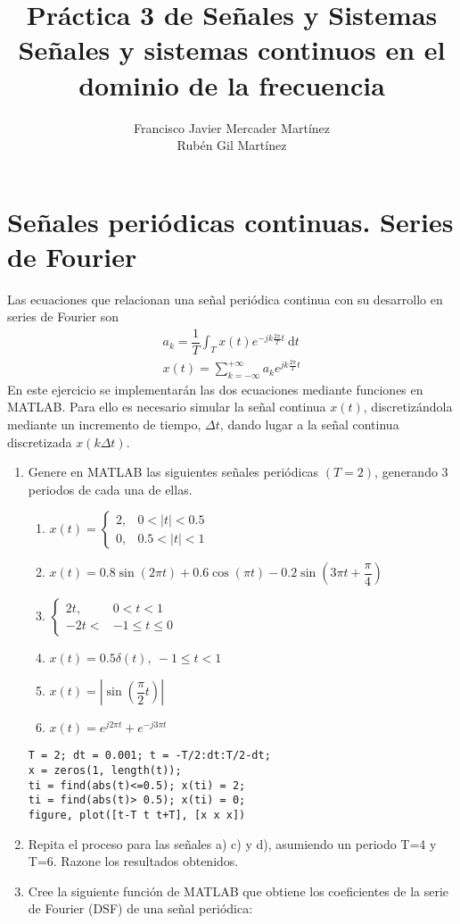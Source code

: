 \documentclass{article}
\title{\textbf{\huge Práctica 3 de Señales y Sistemas}\\ Señales y sistemas continuos en el dominio de la frecuencia}
\author{Francisco Javier Mercader Martínez\\ Rubén Gil Martínez}
\date{}
\newcommand{\dt}{\:\mathrm{d}t}
\begin{document}
\section{Señales periódicas continuas. Series de Fourier}
Las ecuaciones que relacionan una señal periódica continua con su desarrollo en series de Fourier son \[ \begin{array}{l}
	a_k=\dfrac{1}{T}\int_Tx(t)e^{-jk\frac{2\pi}{T}t}\dt\\
	x(t)=\sum_{k=-\infty}^{+\infty}a_ke^{jk\frac{2\pi}{T}t}
\end{array} \]
En este ejercicio se implementarán las dos ecuaciones mediante funciones en MATLAB. Para ello es necesario simular la señal continua $x(t)$, discretizándola mediante un incremento de tiempo, $\Delta t$, dando lugar a la señal continua discretizada $x(k\Delta t)$.
\begin{enumerate}[leftmargin=*]
	\item Genere en MATLAB las siguientes señales periódicas $(T=2)$, generando 3 periodos de cada una de ellas.
	\begin{enumerate}[label=\alph*)]
		\item $x(t)=\begin{cases}
			2, & 0<|t|<0.5\\
			0,&0.5<|t|<1
		\end{cases}$
		\item $x(t)=0.8\sin(2\pi t)+0.6\cos(\pi t)-0.2\sin\left(3\pi t+\dfrac{\pi}{4}\right)$
		\item $\begin{cases}
			2t, & 0<t<1\\
			-2t<&-1\le t\le0
		\end{cases}$
		\item $x(t)=0.5\delta(t),\:-1\le t<1$
		\item $x(t)=\left|\sin\left(\dfrac{\pi}{2}t\right)\right|$
		\item $x(t)=e^{j2\pi t}+e^{-j3\pi t}$
	\end{enumerate}
	\begin{lstlisting}
T = 2; dt = 0.001; t = -T/2:dt:T/2-dt;
x = zeros(1, length(t));
ti = find(abs(t)<=0.5); x(ti) = 2;
ti = find(abs(t)> 0.5); x(ti) = 0;
figure, plot([t-T t t+T], [x x x])
	\end{lstlisting}
	\item Repita el proceso para las señales a) c) y d), asumiendo un periodo T=4 y T=6. Razone los resultados obtenidos.
	\item Cree la siguiente función de MATLAB que obtiene los coeficientes de la serie de Fourier (DSF) de una señal periódica:
	

\end{enumerate}
\end{document}
